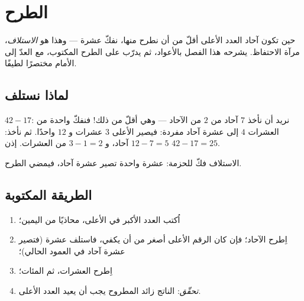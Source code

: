 \chapter{الطرح}\label{ch:g2:subtraction}

حين تكون آحاد العدد الأعلى أقلّ من أن نطرح منها، نفكّ عشرة ---
وهذا هو \emph{الاستلاف}، مرآة الاحتفاظ. يشرحه هذا الفصل
بالأعواد، ثم يدرّب على الطرح المكتوب، مع العدّ إلى الأمام
مختصرًا لطيفًا.

\section{لماذا نستلف}

\begin{example}[فكّ عشرة]\label{ex:g2:subtraction:unbundle}
$42 - 17$: نريد أن نأخذ $7$ آحاد من $2$ من الآحاد --- وهي أقلّ
من ذلك! فنفكّ واحدة من العشرات $4$ إلى عشرة آحاد مفردة: فيصير
الأعلى $3$ عشرات و $12$ واحدًا. ثم نأخذ: $12 - 7 = 5$ آحاد، و
$3 - 1 = 2$ من العشرات. إذن $42 - 17 = 25$.
\end{example}

\begin{omfigure}

{\small الاستلاف فكّ للحزمة: عشرة واحدة تصير عشرة آحاد، فيمضي
الطرح.}
\end{omfigure}

\section{الطريقة المكتوبة}

\begin{method}\label{met:g2:subtraction:column}
\begin{enumerate}
  \item اُكتب العدد الأكبر في الأعلى، محاذيًا من اليمين؛
  \item اِطرح الآحاد؛ فإن كان الرقم الأعلى أصغر من أن يكفي،
        فاستلف عشرة (فتصير عشرة آحاد في العمود الحالي)؛
  \item اِطرح العشرات، ثم المئات؛
  \item \emph{تحقّق}: الناتج زائد المطروح يجب أن يعيد العدد
        الأعلى.
\end{enumerate}
\end{method}


